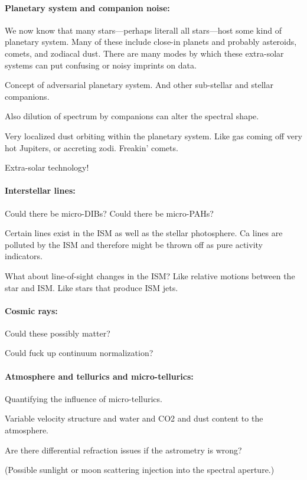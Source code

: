 \documentclass[12pt, fullpage, letterpaper]{article}
\begin{document}
\paragraph{Planetary system and companion noise:}
We now know that many stars---perhaps literall all stars---host some
kind of planetary system.
Many of these include close-in planets and probably asteroids, comets,
and zodiacal dust.
There are many modes by which these extra-solar systems can put
confusing or noisy imprints on \EPRV data.

Concept of adversarial planetary system. And other sub-stellar and stellar companions.

Also dilution of spectrum by companions can alter the spectral shape.

Very localized dust orbiting within the planetary system. Like gas
coming off very hot Jupiters, or accreting zodi. Freakin' comets.

Extra-solar technology!

\paragraph{Interstellar lines:}
Could there be micro-DIBs? Could there be micro-PAHs?

Certain lines exist in the ISM as well as the stellar photosphere. Ca
lines are polluted by the ISM and therefore might be thrown off as
pure activity indicators.

What about line-of-sight changes in the ISM? Like relative motions
between the star and ISM. Like stars that produce ISM jets.

\paragraph{Cosmic rays:}
Could these possibly matter?

Could fuck up continuum normalization?

\paragraph{Atmosphere and tellurics and micro-tellurics:}
Quantifying the influence of micro-tellurics.

Variable velocity structure and water and CO2 and dust content to the atmosphere.

Are there differential refraction issues if the astrometry is wrong?

(Possible sunlight or moon scattering injection into the spectral aperture.)
\end{document}
